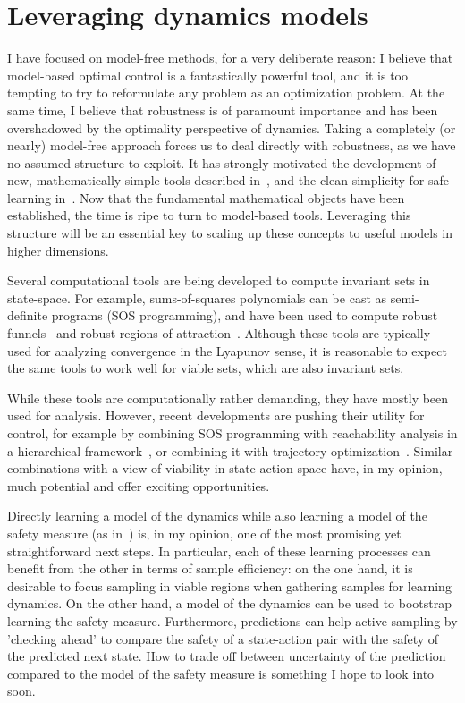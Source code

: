\section{Leveraging dynamics models} \label{chap:discussion}
I have focused on model-free methods, for a very deliberate reason: I believe that model-based optimal control is a fantastically powerful tool, and it is too tempting to try to reformulate any problem as an optimization problem.
At the same time, I believe that robustness is of paramount importance and has been overshadowed by the optimality perspective of dynamics.
Taking a completely (or nearly) model-free approach forces us to deal directly with robustness, as we have no assumed structure to exploit.
It has strongly motivated the development of new, mathematically simple tools described in~\cite{heim2019beyond}, and the clean simplicity for safe learning in~\cite{heim2019learnable}.
Now that the fundamental mathematical objects have been established, the time is ripe to turn to model-based tools. Leveraging this structure will be an essential key to scaling up these concepts to useful models in higher dimensions. \par
Several computational tools are being developed to compute invariant sets in state-space. For example, sums-of-squares polynomials can be cast as semi-definite programs (SOS programming), and have been used to compute robust funnels~\cite{majumdar2013robust} and robust regions of attraction~\cite{valmorbida2014roa_invariants}. Although these tools are typically used for analyzing convergence in the Lyapunov sense, it is reasonable to expect the same tools to work well for viable sets, which are also invariant sets. \par
While these tools are computationally rather demanding, they have mostly been used for analysis. However, recent developments are pushing their utility for control, for example by combining SOS programming with reachability analysis in a hierarchical framework~\cite{singh2018robust}, or combining it with trajectory optimization~\cite{manchester2019robust}. Similar combinations with a view of viability in state-action space have, in my opinion, much potential and offer exciting opportunities. \par
Directly learning a model of the dynamics while also learning a model of the safety measure (as in~\cite{heim2019learnable}) is, in my opinion, one of the most promising yet straightforward next steps. In particular, each of these learning processes can benefit from the other in terms of sample efficiency: on the one hand, it is desirable to focus sampling in viable regions when gathering samples for learning dynamics. On the other hand, a model of the dynamics can be used to bootstrap learning the safety measure. Furthermore, predictions can help active sampling by 'checking ahead' to compare the safety of a state-action pair with the safety of the predicted next state. How to trade off between uncertainty of the prediction compared to the model of the safety measure is something I hope to look into soon.